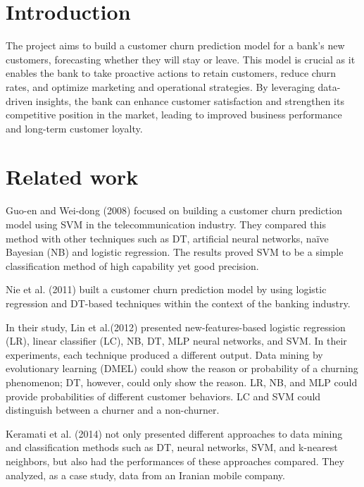 \documentclass{article}
\begin{document}
\begin{multicols}{2}

\section{Introduction}


The project aims to build a customer churn prediction model for a bank's new customers, forecasting whether they will stay or leave. This model is crucial as it enables the bank to take proactive actions to retain customers, reduce churn rates, and optimize marketing and operational strategies. By leveraging data-driven insights, the bank can enhance customer satisfaction and strengthen its competitive position in the market, leading to improved business performance and long-term customer loyalty.

\section{Related work}

Guo-en and Wei-dong (2008) focused on building a customer churn prediction model using SVM in the telecommunication industry. They compared this method with other techniques such as DT, artificial neural networks, naïve Bayesian (NB) and logistic regression. The results proved SVM to be a simple classification method of high capability yet good precision. \cite{article}

Nie et al. (2011) built a customer churn prediction model by using logistic regression and DT-based techniques within the context of the banking industry. \cite{journals/eswa/NieRZTS11}

In their study, Lin et al.(2012) presented new-features-based logistic regression (LR), linear classifier (LC), NB, DT, MLP neural networks, and SVM. In their experiments, each technique produced a different output. Data mining by evolutionary learning (DMEL) could show the reason or probability of a churning phenomenon; DT, however, could only show the reason. LR, NB, and MLP could provide probabilities of different customer behaviors. LC and SVM could distinguish between a churner and a non-churner. \cite{LIN20118}

Keramati et al. (2014) not only presented different approaches to data mining and classification methods such as DT, neural networks, SVM, and k-nearest neighbors, but also had the performances of these approaches compared. They analyzed, as a case study, data from an Iranian mobile company. \cite{NIE201115273}


\end{multicols}
\end{document}
